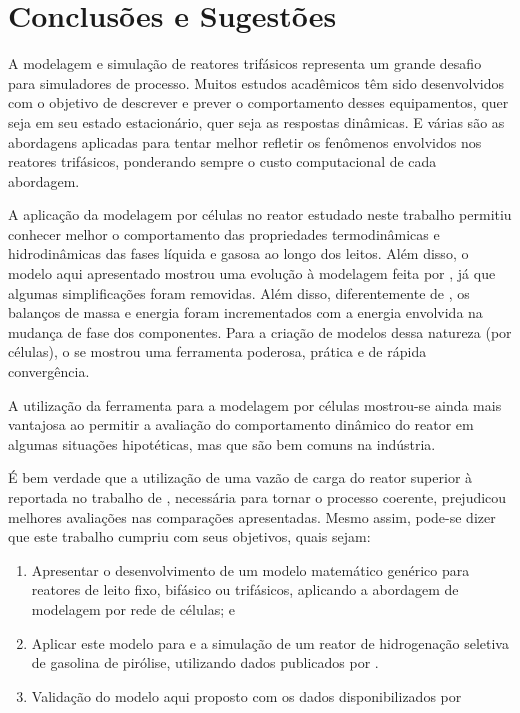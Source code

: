 %
% 
%
\chapter{Conclusões e Sugestões} \label{chap:conclusoes}
%

A modelagem e simulação de reatores trifásicos representa um grande
desafio para simuladores de processo. Muitos estudos acadêmicos têm
sido desenvolvidos com o objetivo de descrever e prever o comportamento desses
equipamentos, quer seja em seu estado estacionário, quer seja as respostas
dinâmicas. E várias são as abordagens aplicadas para tentar melhor refletir os
fenômenos envolvidos nos reatores trifásicos, ponderando sempre o custo
computacional de cada abordagem.

A aplicação da modelagem por células no reator estudado neste trabalho permitiu
conhecer melhor o comportamento das propriedades termodinâmicas e hidrodinâmicas
das fases líquida e gasosa ao longo dos leitos. Além disso, o modelo aqui
apresentado mostrou uma evolução à modelagem feita por ,
já que algumas simplificações foram removidas. Além disso,
diferentemente de , os balanços de massa e energia foram
incrementados com a energia envolvida na mudança de fase dos componentes. Para
a criação de modelos dessa natureza (por células), o \emso{} se
mostrou uma ferramenta poderosa, prática e de rápida convergência.

A utilização da ferramenta \emso{} para a modelagem por células mostrou-se
ainda mais vantajosa ao permitir a avaliação do comportamento dinâmico do reator
em algumas situações hipotéticas, mas que são bem comuns na indústria.

É bem verdade que a utilização de uma vazão de carga do reator superior à
reportada no trabalho de , necessária para
tornar o processo coerente, prejudicou melhores avaliações nas comparações
apresentadas. Mesmo assim, pode-se dizer que este trabalho cumpriu
com seus objetivos, quais sejam:

\begin{enumerate}
  \item Apresentar o desenvolvimento de um modelo matemático genérico para
  reatores de leito fixo, bifásico ou trifásicos, aplicando a abordagem de
  modelagem por rede de células; e 
  \item Aplicar este modelo para e a simulação de um reator de
  hidrogenação seletiva de gasolina de pirólise, utilizando dados publicados por
  .
  \item Validação do modelo aqui proposto com os dados disponibilizados por
\end{enumerate}

